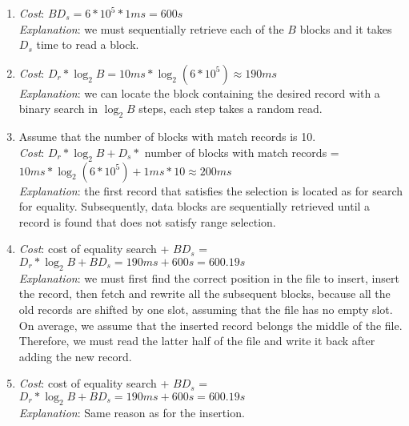 \documentclass[10pt]{article}
\begin{document}
\begin{enumerate}
\begin{enumerate}
\item \emph{Cost}: $BD_s = 6 * 10^5 * 1ms = 600s$\\
  \emph{Explanation}: we must sequentially retrieve each of the $B$
  blocks and it takes $D_s$ time to read a block.
\item \emph{Cost}: $D_r * \log_2B = 10ms * \log_2(6*10^5) \approx
  190ms$\\
  \emph{Explanation}: we can locate the block containing the desired
  record with a binary search in $\log_2B$ steps, each step takes a
  random read.
\item Assume that the number of blocks with match records is 10.\\
  \emph{Cost}: $D_r * \log_2B + D_s *$ number of blocks with match
  records = $10ms * \log_2(6*10^5) + 1ms * 10 \approx 200ms$\\
  \emph{Explanation}: the first record that satisfies the selection is
  located as for search for equality. Subsequently, data blocks are
  sequentially retrieved until a record is found that does not satisfy
  range selection.
\item \emph{Cost}: cost of equality search + $BD_s$ = $D_r * \log_2B +
  BD_s = 190ms + 600s = 600.19s$\\
  \emph{Explanation}: we must first find the correct position in the
  file to insert, insert the record, then fetch and rewrite all the
  subsequent blocks, because all the old records are shifted by one
  slot, assuming that the file has no empty slot. On average, we
  assume that the inserted record belongs the middle of the
  file. Therefore, we must read the latter half of the file and write
  it back after adding the new record.
\item \emph{Cost}: cost of equality search + $BD_s$ = $D_r * \log_2B +
  BD_s = 190ms + 600s = 600.19s$\\
  \emph{Explanation}: Same reason as for the insertion.


\end{enumerate}
\end{enumerate}
\end{document}
